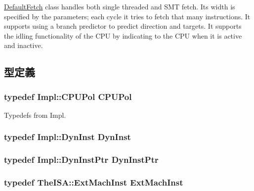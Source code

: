 \hyperlink{classDefaultFetch}{DefaultFetch} class handles both single threaded and SMT fetch. Its width is specified by the parameters; each cycle it tries to fetch that many instructions. It supports using a branch predictor to predict direction and targets. It supports the idling functionality of the CPU by indicating to the CPU when it is active and inactive. 

\subsection{型定義}
\hypertarget{classDefaultFetch_a87d662eaeb9eab249d671b63cb4ba11a}{
\subsubsection[{CPUPol}]{\setlength{\rightskip}{0pt plus 5cm}typedef Impl::CPUPol {\bf CPUPol}}}
\label{classDefaultFetch_a87d662eaeb9eab249d671b63cb4ba11a}
Typedefs from Impl. \hypertarget{classDefaultFetch_ab741745c86a14c765b999c11167636d9}{
\subsubsection[{DynInst}]{\setlength{\rightskip}{0pt plus 5cm}typedef Impl::DynInst {\bf DynInst}}}
\label{classDefaultFetch_ab741745c86a14c765b999c11167636d9}
\hypertarget{classDefaultFetch_a028ce10889c5f6450239d9e9a7347976}{
\subsubsection[{DynInstPtr}]{\setlength{\rightskip}{0pt plus 5cm}typedef Impl::DynInstPtr {\bf DynInstPtr}}}
\label{classDefaultFetch_a028ce10889c5f6450239d9e9a7347976}
\hypertarget{classDefaultFetch_a5605d4fc727eae9e595325c90c0ec108}{
\subsubsection[{ExtMachInst}]{\setlength{\rightskip}{0pt plus 5cm}typedef TheISA::ExtMachInst {\bf ExtMachInst}}}
\label{classDefaultFetch_a5605d4fc727eae9e595325c90c0ec108}
